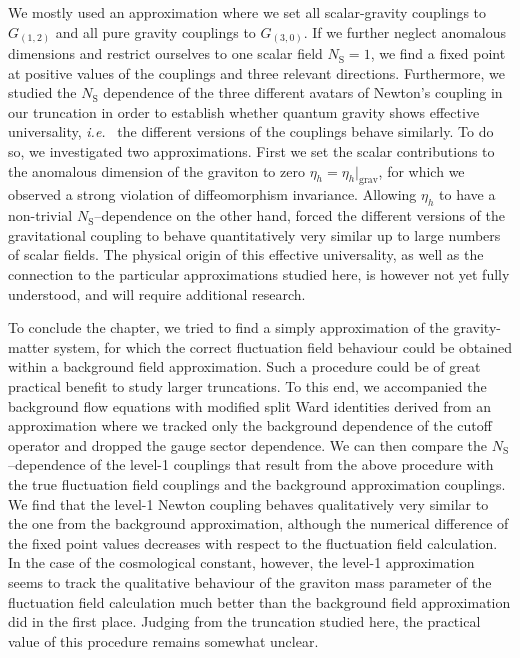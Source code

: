 \documentclass[11pt]{book}
\newcommand\NS{ N_{\scriptscriptstyle{\mathrm{S}}} }
\newcommand\ie{\textit{i.e.}\ }
\numberwithin{equation}{chapter}
\begin{document}
We mostly used an approximation where we set all scalar-gravity couplings
to $G_{(1,2)}$ and all pure gravity couplings to $G_{(3,0)}$. If we further
neglect anomalous dimensions and restrict ourselves to one scalar field
$\NS = 1$, we find a fixed point at positive values of the couplings and
three relevant directions. Furthermore, we studied the $\NS$ dependence of the
three different avatars of Newton's coupling in our truncation in order
to establish whether quantum gravity shows effective universality, \ie
the different versions of the couplings behave similarly. To do so,
we investigated two approximations. First we set the scalar contributions
to the anomalous dimension of the graviton to zero $\eta_h=\eta_h |_{\text{grav}}$,
for which we observed a strong violation of diffeomorphism invariance.
Allowing $\eta_h$ to have a non-trivial $\NS$--dependence on the other hand,
forced the different versions of the gravitational coupling to behave quantitatively
very similar up to large numbers of scalar fields.
The physical origin of this effective universality,
as well as the connection to the particular approximations studied here, is
however not yet fully understood, and will require additional research.

To conclude the chapter, we tried to find a simply approximation of the
gravity-matter system, for which the correct fluctuation field behaviour
could be obtained within a background field approximation. Such a procedure
could be of great practical benefit to study larger truncations.
To this end,
we accompanied the background flow equations with modified split Ward
identities derived from an approximation where we tracked only the background
dependence of the cutoff operator and dropped the gauge sector dependence.
We can then compare the $\NS$--dependence of the level-1 couplings that result
from the above procedure with the true fluctuation field couplings and the background
approximation couplings. We find that the level-1 Newton coupling behaves qualitatively
very similar to the one from the background approximation, although the numerical
difference of the fixed point values decreases with respect to the fluctuation field
calculation. In the case of the cosmological constant, however, the level-1 approximation
seems to track the qualitative behaviour of the graviton mass parameter of the fluctuation
field calculation much better than the background field approximation did in the first place.
Judging from the truncation studied here, the practical value of this procedure
remains somewhat unclear.
\end{document}

